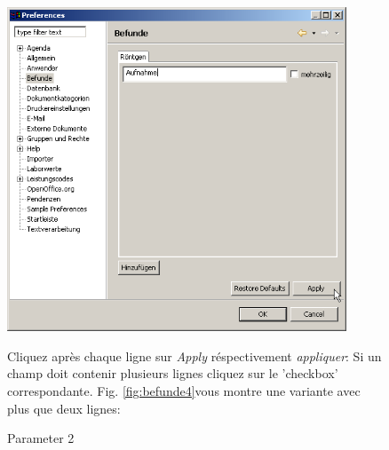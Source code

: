 \begin{figure}[htbp]
   \begin{minipage}{0.35\textwidth}
       \centering
       \includegraphics[width=0.9\textwidth]{images/befunde2}
       \caption{Parameter 2}
       \label{fig:befundesettings}
     \end{minipage}\hfill
     \begin{minipage}{0.65\textwidth}
        Cliquez après chaque ligne sur   \textit{Apply}  réspectivement  \textit{appliquer}:
        Si un champ doit contenir plusieurs lignes cliquez sur le 'checkbox' correspondante. Fig. \ref{fig:befunde4}vous montre une variante avec plus que deux lignes:

    \end{minipage}
\end{figure}
